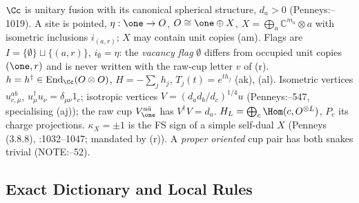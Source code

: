 \(\Cc\) is unitary fusion with its canonical spherical structure, \(d_a>0\) (Penneys:--1019). A site is pointed,
\(\eta:\one\to O\), \(O\cong\one\oplus X\), \(X=\bigoplus_a\mathbb C^{m_a}\otimes a\) with isometric inclusions \(i_{(a,r)}\); \(X\) may
contain unit copies (am). Flags are \(I=\{\emptyset\}\sqcup\{(a,r)\}\), \(i_\emptyset=\eta\): the \emph{vacancy flag} \(\emptyset\) differs
from occupied unit copies \((\one,r)\) and is never written with the raw-cup letter \(v\) of (r). \(h=h^\dagger\in\operatorname{End}_\Cc(O\otimes O)\),
\(H=-\sum_jh_j\), \(T_j(t)=e^{th_j}\) (ak), (al). Isometric vertices \(u^{ab}_{c,\mu}\), \(u_\mu^\dagger u_\nu=\delta_{\mu\nu}1_c\); isotropic
vertices \(V=(d_ad_b/d_c)^{1/4}u\) (Penneys:--547, specialising (aj)); the raw cup \(V^{a\bar a}_\one\) has \(V^\dagger V=d_a\).
\(H_L=\bigoplus_c\Hom(c,O^{\otimes L})\), \(P_c\) its charge projections. \(\kappa_X=\pm1\) is the FS sign of a simple self-dual \(X\)
(Penneys (3.8.8), :1032--1047; mandated by (r)). A \emph{proper oriented} cup pair has both snakes trivial (NOTE:--52).

\subsection{Exact Dictionary and Local Rules}

